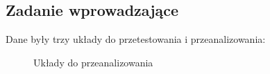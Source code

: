 \documentclass[12pt]{article}
\begin{document}
\subsection{Zadanie wprowadzające}
Dane były trzy układy do przetestowania i przeanalizowania:

\begin{figure}[H]
    \centering
    \quad
    \caption{Układy do przeanalizowania}
\end{figure}
\end{document}
